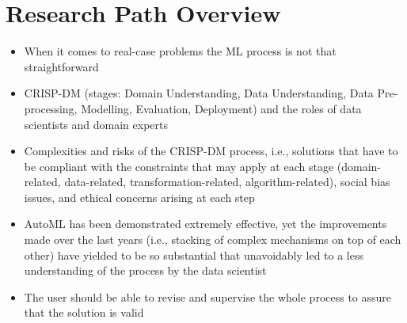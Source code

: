 \chapter{Research Path Overview}
\label{automl-chap:formalization}



\begin{itemize}
    \item When it comes to real-case problems the ML process is not that straightforward
    \item CRISP-DM (stages: Domain Understanding, Data Understanding, Data Pre-processing, Modelling, Evaluation, Deployment) and the roles of data scientists and domain experts
    \item Complexities and risks of the CRISP-DM process, i.e., solutions that have to be compliant with the constraints that may apply at each stage (domain-related, data-related, transformation-related, algorithm-related), social bias issues, and ethical concerns arising at each step
    \item AutoML has been demonstrated extremely effective, yet the improvements made over the last years (i.e., stacking of complex mechanisms on top of each other) have yielded to be so substantial that unavoidably led to a less understanding of the process by the data scientist
    \item The user should be able to revise and supervise the whole process to assure that the solution is valid
\end{itemize}



